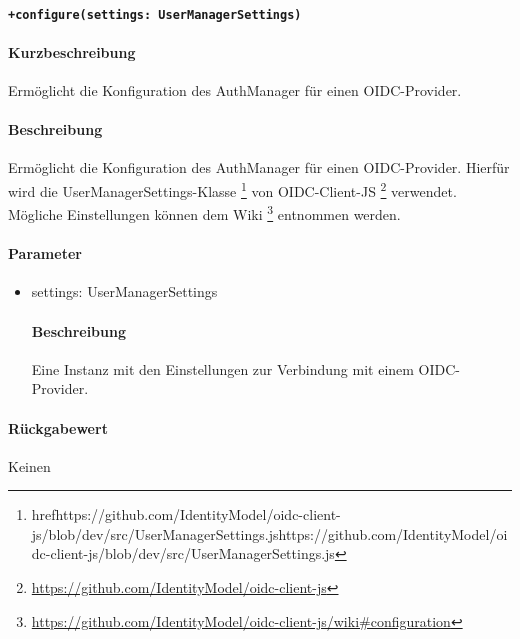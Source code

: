 \paragraph{\texttt{+configure(settings: UserManagerSettings)}}%
\paragraph*{Kurzbeschreibung}
Ermöglicht die Konfiguration des AuthManager für einen OIDC-Provider.
\paragraph*{Beschreibung}
Ermöglicht die Konfiguration des AuthManager für einen OIDC-Provider.
Hierfür wird die UserManagerSettings-Klasse \footnote{href{https://github.com/IdentityModel/oidc-client-js/blob/dev/src/UserManagerSettings.js}{https://github.com/IdentityModel/oidc-client-js/blob/dev/src/UserManagerSettings.js}} von 
OIDC-Client-JS \footnote{\href{https://github.com/IdentityModel/oidc-client-js}{https://github.com/IdentityModel/oidc-client-js}} verwendet.
Mögliche Einstellungen können dem Wiki \footnote{\href{https://github.com/IdentityModel/oidc-client-js/wiki#configuration}{https://github.com/IdentityModel/oidc-client-js/wiki#configuration}} entnommen werden.
\paragraph*{Parameter}
\begin{itemize}
    \item settings: UserManagerSettings
            \paragraph*{Beschreibung}
            Eine Instanz mit den Einstellungen zur Verbindung mit einem OIDC-Provider.
\end{itemize}
\paragraph*{Rückgabewert}
Keinen
